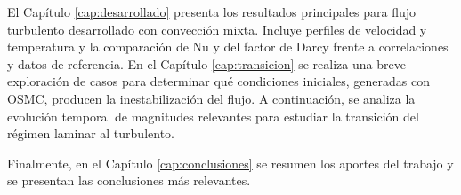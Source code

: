 El Capítulo \ref{cap:desarrollado} presenta los resultados principales para flujo turbulento desarrollado con convección mixta. Incluye perfiles de velocidad y temperatura y la comparación de Nu y del factor de Darcy frente a correlaciones y datos de referencia. En el Capítulo \ref{cap:transicion} se realiza una breve exploración de casos para determinar qué condiciones iniciales, generadas con OSMC, producen la inestabilización del flujo. A continuación, se analiza la evolución temporal de magnitudes relevantes para estudiar la transición del régimen laminar al turbulento.

Finalmente, en el Capítulo \ref{cap:conclusiones} se resumen los aportes del trabajo y se presentan las conclusiones más relevantes.